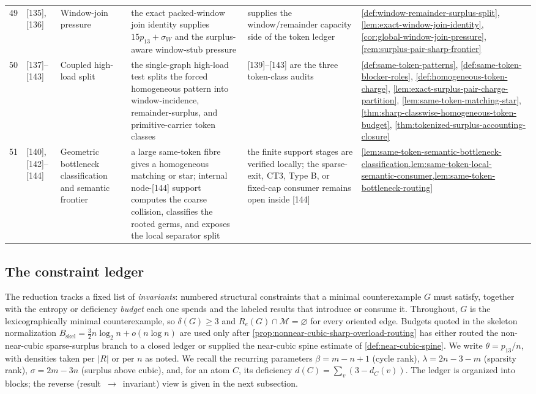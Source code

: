 \documentclass[11pt]{article}
\newcommand{\Mers}{\mathcal M}
\begin{document}
{\begin{longtable}{C{0.04\textwidth} L{0.13\textwidth} L{0.17\textwidth} L{0.25\textwidth} L{0.21\textwidth} L{0.12\textwidth}}
49 & [135], [136] & Window-join pressure & the exact packed-window join identity supplies \(15p_{13}+\sigma_W\) and the surplus-aware window-stub pressure & supplies the window/remainder capacity side of the token ledger & \cref{def:window-remainder-surplus-split}, \cref{lem:exact-window-join-identity}, \cref{cor:global-window-join-pressure}, \cref{rem:surplus-pair-sharp-frontier} \\
50 & [137]--[143] & Coupled high-load split & the single-graph high-load test splits the forced homogeneous pattern into window-incidence, remainder-surplus, and primitive-carrier token classes & [139]--[143] are the three token-class audits & \cref{def:same-token-patterns}, \cref{def:same-token-blocker-roles}, \cref{def:homogeneous-token-charge}, \cref{lem:exact-surplus-pair-charge-partition}, \cref{lem:same-token-matching-star}, \cref{thm:sharp-classwise-homogeneous-token-budget}, \cref{thm:tokenized-surplus-accounting-closure} \\
51 & [140], [142]--[144] & Geometric bottleneck classification and semantic frontier & a large same-token fibre gives a homogeneous matching or star; internal node-[144] support computes the coarse collision, classifies the rooted germs, and exposes the local separator split & the finite support stages are verified locally; the sparse-exit, CT3, Type B, or fixed-cap consumer remains open inside [144] & \cref{lem:same-token-semantic-bottleneck-classification,lem:same-token-local-semantic-consumer,lem:same-token-bottleneck-routing} \\
\bottomrule
\end{longtable}
}

\subsection*{The constraint ledger}

The reduction tracks a fixed list of \emph{invariants}: numbered structural constraints that a minimal counterexample $G$ must satisfy, together with the entropy or deficiency \emph{budget} each one spends and the labeled results that introduce or consume it.  Throughout, $G$ is the lexicographically minimal counterexample, so $\delta(G)\ge3$ and $R_e(G)\cap\Mers=\varnothing$ for every oriented edge.  Budgets quoted in the skeleton normalization $B_{\mathrm{skel}}=\tfrac32 n\log_2 n+o(n\log n)$ are used only after \cref{prop:nonnear-cubic-sharp-overload-routing} has either routed the non-near-cubic sparse-surplus branch to a closed ledger or supplied the near-cubic spine estimate of \cref{def:near-cubic-spine}.  We write $\theta=p_{13}/n$, with densities taken per $|R|$ or per $n$ as noted.  We recall the recurring parameters $\beta=m-n+1$ (cycle rank), $\lambda=2n-3-m$ (sparsity rank), $\sigma=2m-3n$ (surplus above cubic), and, for an atom $C$, its deficiency $d(C)=\sum_{v}(3-d_C(v))$.  The ledger is organized into blocks; the reverse (result~$\to$~invariant) view is given in the next subsection.
\end{document}
